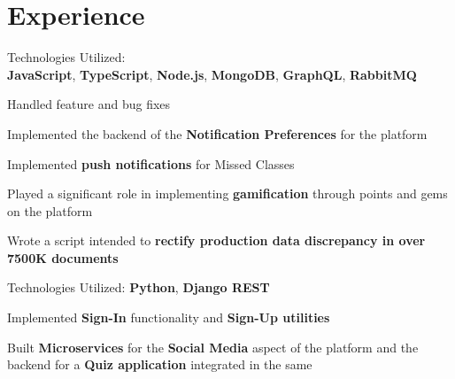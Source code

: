 \documentclass[]{deedy-resume-openfont}
\begin{document}
\begin{minipage}[t]{0.33\textwidth}

%
%

\end{minipage} 
\hfill
\begin{minipage}[t]{0.66\textwidth} 


\section{Experience}

\sectionsep
\begin{tightemize}
\item Technologies Utilized: \\\textbf{JavaScript}, \textbf{TypeScript}, \textbf{Node.js}, \textbf{MongoDB}, \textbf{GraphQL}, \textbf{RabbitMQ}
\item Handled feature and bug fixes
\item Implemented the backend of the \textbf{Notification Preferences} for the platform
\item Implemented \textbf{push notifications} for Missed Classes
\item Played a significant role in implementing \textbf{gamification} through points and gems on the platform
\item Wrote a script intended to \textbf{rectify production data discrepancy in over 7500K documents}
\end{tightemize}

\begin{tightemize}
\item Technologies Utilized: \textbf{Python}, \textbf{Django REST}
\item Implemented \textbf{Sign-In} functionality and \textbf{Sign-Up utilities}
\item Built \textbf{Microservices} for the \textbf{Social Media} aspect of the platform and the backend for a \textbf{Quiz application} integrated in the same
\end{tightemize}


\end{minipage}
\end{document}
